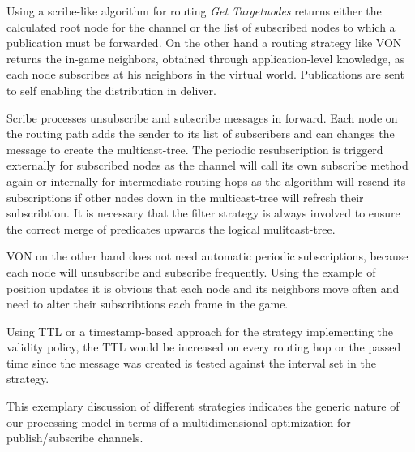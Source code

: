 Using a scribe-like algorithm for routing \emph{Get Targetnodes} returns either the calculated root node for the channel or the list of subscribed nodes to which a publication must be forwarded. On the other hand a routing strategy like VON returns the in-game neighbors, obtained through application-level knowledge, as each node subscribes at his neighbors in the virtual world. Publications are sent to self enabling the distribution in deliver.

Scribe processes unsubscribe and subscribe messages in forward. Each node on the routing path adds the sender to its list of subscribers and can changes the message to create the multicast-tree. The periodic resubscription is triggerd externally for subscribed nodes as the channel will call its own subscribe method again or internally for intermediate routing hops as the algorithm will resend its subscriptions if other nodes down in the multicast-tree will refresh their subscribtion. It is necessary that the filter strategy is always involved to ensure the correct merge of predicates upwards the logical mulitcast-tree.

VON on the other hand does not need automatic periodic subscriptions, because each node will unsubscribe and subscribe frequently. Using the example of position updates it is obvious that each node and its neighbors move often and need to alter their subscribtions each frame in the game.

Using TTL or a timestamp-based approach for the strategy implementing the validity policy, the TTL would be increased on every routing hop or the passed time since the message was created is tested against the interval set in the strategy.

This exemplary discussion of different strategies indicates the generic nature of our processing model in terms of a multidimensional optimization for publish/subscribe channels.
